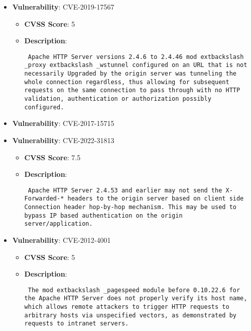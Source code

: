 \documentclass{article}
\begin{document}
\begin{itemize}
        \item \textbf{Vulnerability}: CVE-2019-17567
        \begin{itemize}
            \item \textbf{CVSS Score}:  5 
            \item \textbf{Description}: \parbox{\linewidth}{\texttt{ Apache HTTP Server versions 2.4.6 to 2.4.46 mod	extbackslash _proxy	extbackslash _wstunnel configured on an URL that is not necessarily Upgraded by the origin server was tunneling the whole connection regardless, thus allowing for subsequent requests on the same connection to pass through with no HTTP validation, authentication or authorization possibly configured. }}
        \end{itemize}
    
        \item \textbf{Vulnerability}: CVE-2017-15715
    
        \item \textbf{Vulnerability}: CVE-2022-31813
        \begin{itemize}
            \item \textbf{CVSS Score}:  7.5 
            \item \textbf{Description}: \parbox{\linewidth}{\texttt{ Apache HTTP Server 2.4.53 and earlier may not send the X-Forwarded-* headers to the origin server based on client side Connection header hop-by-hop mechanism. This may be used to bypass IP based authentication on the origin server/application. }}
        \end{itemize}
    
        \item \textbf{Vulnerability}: CVE-2012-4001
        \begin{itemize}
            \item \textbf{CVSS Score}:  5 
            \item \textbf{Description}: \parbox{\linewidth}{\texttt{ The mod	extbackslash _pagespeed module before 0.10.22.6 for the Apache HTTP Server does not properly verify its host name, which allows remote attackers to trigger HTTP requests to arbitrary hosts via unspecified vectors, as demonstrated by requests to intranet servers. }}
        \end{itemize}
    

\end{itemize}
\end{document}
